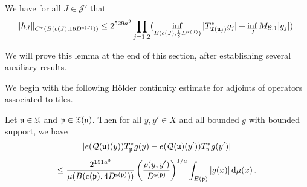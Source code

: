     \begin{lemma}
        \label{Holder-correlation-tree}
        \leanok
        We have for all $J \in \mathcal{J}'$ that
      \begin{equation}
            \label{hHolder}
            \|h_J\|_{C^{\tau}(B(c(J), 16D^{s(J)}))} \le 2^{529a^3} \prod_{j = 1,2} (\inf_{B(c(J), \frac{1}{8}D^{s(J)})} |T_{{\mathfrak T}({\mathfrak u}_j)}^* g_j| + \inf_J M_{\mathcal{B}, 1} |g_j|)\,.
        \end{equation}
    \end{lemma}

    We will prove this lemma at the end of this section, after establishing several auxiliary results.

    We begin with the following H\"older continuity estimate for adjoints of operators associated to tiles.
    \begin{lemma}
        \label{Holder-correlation-tile}
        \leanok
        Let ${\mathfrak u} \in {\mathfrak U}$ and ${\mathfrak p} \in {\mathfrak T}({\mathfrak u})$. Then for all $y, y' \in X$ and all bounded $g$ with bounded support, we have
        $$
            |e({\mathcal{Q}}({\mathfrak u})(y)) T_{{\mathfrak p}}^* g(y) - e({\mathcal{Q}}({\mathfrak u})(y')) T_{{\mathfrak p}}^* g(y')|
        $$
      \begin{equation}
            \label{T*Holder2}
            \le \frac{2^{151a^3}}{\mu(B({\mathrm{c}}({\mathfrak p}), 4D^{{\mathrm{s}}({\mathfrak p})}))} \left(\frac{\rho(y, y')}{D^{{\mathrm{s}}({\mathfrak p})}}\right)^{1/a} \int_{E({\mathfrak p})} |g(x)| \, \mathrm{d}\mu(x)\,.
        \end{equation}
    \end{lemma}


